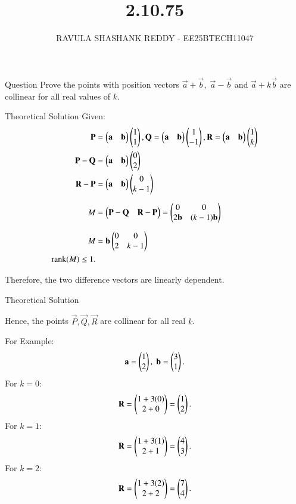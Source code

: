 \documentclass{beamer}
\title %
{2.10.75}
\author %
{RAVULA SHASHANK REDDY - EE25BTECH11047}
\begin{document}
	
	
	\frame{\titlepage}
	\begin{frame}{Question}
Prove the points with position vectors $\vec{a}+\vec{b},\;\vec{a}-\vec{b}$ and $\vec{a}+k\vec{b}$ are collinear for all real values of   $k$.

\end{frame}
\begin{frame}{Theoretical Solution}
    Given:
\begin{align}
    \mathbf{P} &= \begin{pmatrix}\mathbf{a}&\mathbf{b}\end{pmatrix}\begin{pmatrix}1\\1\end{pmatrix},\mathbf{Q}=\begin{pmatrix}\mathbf{a}&\mathbf{b}\end{pmatrix}\begin{pmatrix}1\\-1\end{pmatrix},\mathbf{R} =\begin{pmatrix}\mathbf{a}&\mathbf{b}\end{pmatrix}\begin{pmatrix}1\\k\end{pmatrix} \\
    \mathbf{P}-\mathbf{Q} &=\begin{pmatrix}\mathbf{a}&\mathbf{b}\end{pmatrix}\begin{pmatrix}0\\2\end{pmatrix} \\ 
    \mathbf{R}-\mathbf{P} &= \begin{pmatrix}\mathbf{a}&\mathbf{b}\end{pmatrix}\begin{pmatrix}0\\k-1\end{pmatrix}\\[6pt]
    M &= \begin{pmatrix} \mathbf{P}-\mathbf{Q} & \mathbf{R}-\mathbf{P} \end{pmatrix} 
       = \begin{pmatrix} 0 & 0\\2\mathbf{b} & (k-1)\mathbf{b} \end{pmatrix} \\[6pt]
      M& = \mathbf{b} \begin{pmatrix}0&0\\2 & k-1\end{pmatrix}\\
\text{rank}(M) \leq 1.
\end{align}
\begin{center}
Therefore, the two difference vectors are linearly dependent. \\ 
\end{center}
\end{frame}
\begin{frame}{Theoretical Solution}
\begin{center}
Hence, the points $\vec{P}, \vec{Q}, \vec{R}$ are collinear for all real $k$.
\end{center}

For Example:\\ 
\begin{align}
\mathbf{a}=\begin{pmatrix}1 \\ 2\end{pmatrix},\; \mathbf{b}=\begin{pmatrix}3 \\ 1\end{pmatrix}.
\end{align}
For $k=0$:
\begin{align}
\mathbf{R} = \begin{pmatrix}1+3(0) \\ 2+0\end{pmatrix} = \begin{pmatrix}1 \\ 2\end{pmatrix}.
\end{align}
For $k=1$:
\begin{align}
\mathbf{R} = \begin{pmatrix}1+3(1) \\ 2+1\end{pmatrix} = \begin{pmatrix}4 \\ 3\end{pmatrix}.
\end{align}
For $k=2$:
\begin{align}
\mathbf{R} = \begin{pmatrix}1+3(2) \\ 2+2\end{pmatrix} = \begin{pmatrix}7 \\ 4\end{pmatrix}.
\end{align}
\end{frame}
\end{document}
